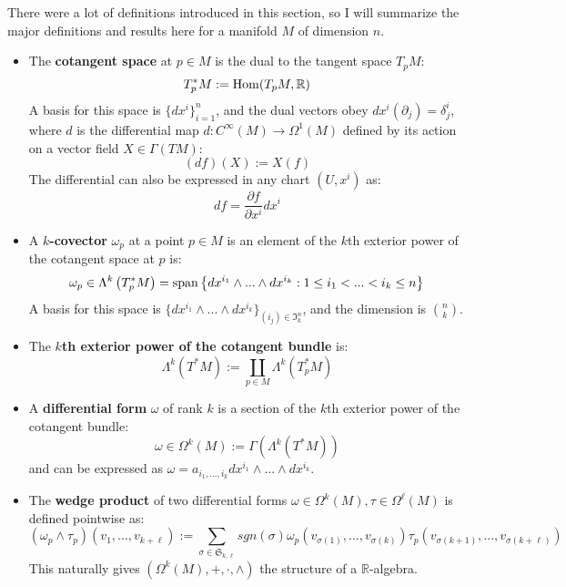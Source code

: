 There were a lot of definitions introduced in this section, so I will summarize the major definitions and results here for a 
manifold $M$ of dimension $n$.
\begin{itemize}
	\item The \textbf{cotangent space} at $p\in M$ is the dual to the tangent space $T_p M$:
	\begin{equation}
		T_p^* M := \mathrm{Hom}(T_p M, \mathbb R)
	\end{equation}
	A basis for this space is $\{dx^i\}_{i = 1}^n$, and the dual vectors obey $dx^i(\partial_j) = \delta^i_j$, where $d$ is the 
	differential map $d : C^\infty(M)\rightarrow\Omega^1(M)$ defined by its action on a vector field $X\in\Gamma(TM)$:
	\begin{equation}
		(df)(X) := X(f)
	\end{equation}
	The differential can also be expressed in any chart $(U, x^i)$ as:
	\begin{equation}
		df = \frac{\partial f}{\partial x^i} dx^i
	\end{equation}
	
	\item A \textbf{$k$-covector} $\omega_p$ at a point $p\in M$ is an element of the $k$th exterior power of the cotangent 
	space at $p$ is: 
	\begin{equation}
		\omega_p\in\Lambda^k\left(T_p^* M\right) = \mathrm{span}\left\{dx^{i_1}\wedge ...\wedge dx^{i_k} : 1\leq i_1 < ... < i_k\leq n 
		\right\}
	\end{equation}
	A basis for this space is $\{dx^{i_1}\wedge ...\wedge dx^{i_k}\}_{(i_j)\in\mathfrak I_k^n}$, and the dimension is $n\choose 
	k$. 
	
	\item The \textbf{$k$th exterior power of the cotangent bundle} is:
	\begin{equation}
		\Lambda^k\left(T^* M\right) :=\coprod_{p\in M}\Lambda^k\left(T_p^* M\right)
	\end{equation}
	
	\item A \textbf{differential form} $\omega$ of rank $k$ is a section of the $k$th exterior power of the cotangent bundle:
	\begin{equation}
		\omega\in\Omega^k(M) := \Gamma(\Lambda^k(T^* M))
	\end{equation}
	and can be expressed as $\omega = a_{i_1, ..., i_k} dx^{i_1}\wedge ...\wedge dx^{i_k}$. 
	
	\item The \textbf{wedge product} of two differential forms $\omega\in\Omega^k(M), \tau\in\Omega^\ell(M)$ is defined 
	pointwise as:
	\begin{equation}
		(\omega_p\wedge\tau_p)(v_1, ..., v_{k + \ell}) := \sum_{\sigma\in\mathfrak S_{k, \ell}} sgn(\sigma)
		\omega_p(v_{\sigma(1)}, ..., v_{\sigma(k)})\tau_p(v_{\sigma(k + 1)}, ..., v_{\sigma(k + \ell)})
	\end{equation}
	This naturally gives $(\Omega^k(M), +, \cdot, \wedge)$ the structure of a $\mathbb R$-algebra. 
	

\end{itemize}
